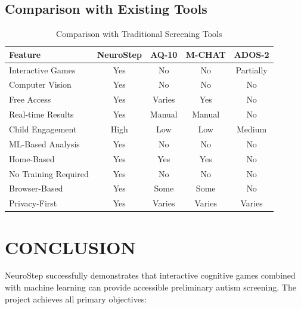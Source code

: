 \documentclass[12pt,letterpaper]{article}
\begin{document}
\subsection{Comparison with Existing Tools}

\begin{table}[H]
\centering
\begin{tabular}{|l|c|c|c|c|}
\hline
\textbf{Feature} & \textbf{NeuroStep} & \textbf{AQ-10} & \textbf{M-CHAT} & \textbf{ADOS-2} \\
\hline
Interactive Games & Yes & No & No & Partially \\
\hline
Computer Vision & Yes & No & No & No \\
\hline
Free Access & Yes & Varies & Yes & No \\
\hline
Real-time Results & Yes & Manual & Manual & No \\
\hline
Child Engagement & High & Low & Low & Medium \\
\hline
ML-Based Analysis & Yes & No & No & No \\
\hline
Home-Based & Yes & Yes & Yes & No \\
\hline
No Training Required & Yes & No & No & No \\
\hline
Browser-Based & Yes & Some & Some & No \\
\hline
Privacy-First & Yes & Varies & Varies & Varies \\
\hline
\end{tabular}
\caption{Comparison with Traditional Screening Tools}
\end{table}

\newpage


\section{CONCLUSION}

NeuroStep successfully demonstrates that interactive cognitive games combined with machine learning can provide accessible preliminary autism screening. The project achieves all primary objectives:
\end{document}
